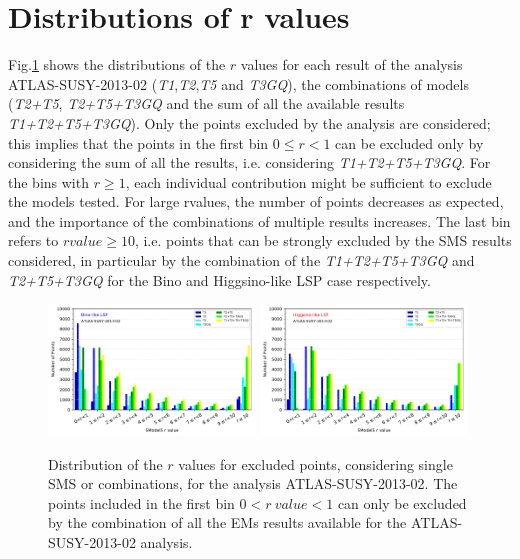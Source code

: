 \documentclass[a4paper,11pt]{article}
\begin{document}
\section{Distributions of r values}
Fig.\ref{Histos_r} shows the distributions of the $r$ values for each result of the analysis ATLAS-SUSY-2013-02 (\textit{T1},\textit{T2},\textit{T5} and \textit{T3GQ}), the combinations of models (\textit{T2+T5}, \textit{T2+T5+T3GQ} and the sum of all the available results \textit{T1+T2+T5+T3GQ}). Only the points excluded by the analysis are considered; this implies that the points in the first bin $0\leq r < 1$ can be excluded only by considering the sum of all the results, i.e. considering \textit{T1+T2+T5+T3GQ}. For the bins with $r \geq 1$, each individual contribution might be sufficient to exclude the models tested. For large rvalues, the number of points decreases as expected, and the importance of the combinations of multiple results increases. The last bin refers to $rvalue \geq 10$, i.e. points that can be strongly excluded by the SMS results considered, in particular by the combination of the \textit{T1+T2+T5+T3GQ} and \textit{T2+T5+T3GQ} for the Bino and Higgsino-like LSP case respectively. 
\begin{figure}[!h]
	\begin{center}
		\subfigure
		{\includegraphics[width=0.49\textwidth]{PLOTS/Combination/ATLAS-SUSY-2013-02_Bino_rValuesHisto.pdf}}
		\subfigure
		{\includegraphics[width=0.49\textwidth]{PLOTS/Combination/ATLAS-SUSY-2013-02_Higgsino_rValuesHisto.pdf}}
	\end{center}
	\caption{Distribution of the $r$ values for excluded points, considering single SMS or combinations, for the analysis ATLAS-SUSY-2013-02. The points included in the first bin $0<r \ value < 1$ can only be excluded by the combination of all the EMs results available for the ATLAS-SUSY-2013-02 analysis.} 
	\label{Histos_r}
\end{figure}


%
%
%
%
\end{document}
